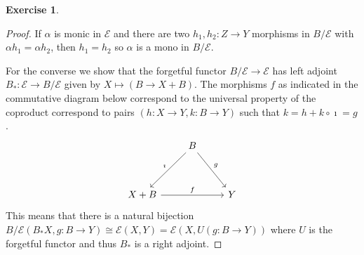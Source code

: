\documentclass{article}
\newcommand{\topos}{\mathcal{E}}
\theoremstyle{definition}
\newtheorem{question}{Exercise}
\begin{document}
\begin{question}
\begin{enumerate}[(a)]
              \begin{proof}
                  If \(\alpha\) is monic in \(\topos\) and there are two
                  \(h_{1},h_{2}:Z\to Y\) morphisms in \(B/\topos\) with \(\alpha
                  h_{1}=\alpha h_{2}\), then \(h_{1}=h_{2}\) so \(\alpha\) is a
                  mono in \(B/\topos\).

                  For the converse we show that the forgetful functor
                  \(B/\topos\to\topos\) has left adjoint \(B_{*}:\topos\to
                  B/\topos\) given by \(X\mapsto (B\to X+B)\). The morphisms
                  \(f\) as indicated in the commutative diagram below correspond
                  to the universal property of the coproduct correspond to pairs
                  \((h:X\to Y,k:B\to Y)\) such that \(k=h+k\circ\imath=g\).
                  \[
                      \begin{tikzcd}[ampersand replacement=\&]
                          \&B\&\\
                          \\
                          X+B\&\&Y
                          \arrow["\imath"', from=1-2, to=3-1]
                          \arrow["g", from=1-2, to=3-3]
                          \arrow["f", from=3-1, to=3-3]
                      \end{tikzcd}
                  \]
                  This means that there is a natural bijection
                  \(B/\topos(B_{*}X,g:B\to Y)\cong\topos(X,Y)=\topos(X,U(g:B\to
                  Y))\) where \(U\) is the forgetful functor and thus \(B_{*}\)
                  is a right adjoint.


\end{proof}
\end{enumerate}
\end{question}
\end{document}
